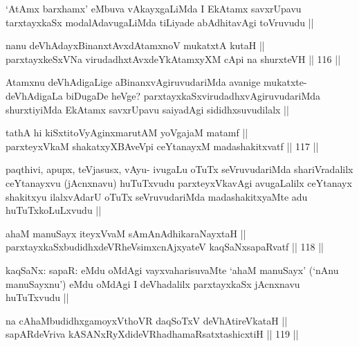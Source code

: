 \begin{artha}
`AtAmx barxhamx' eMbuva vAkayxgaLiMda I EkAtamx savxrUpavu tarxtayxkaSx modalAdavugaLiMda tiLiyade abAdhitavAgi toVruvudu ||             
\end{artha}


\begin{shl}
nanu deVhAdayxBinanxtAvxdAtamxnoV mukatxtA kutaH ||  \\
parxtayxkeSxVNa virudadhxtAvxdeYkAtamxyXM cApi na shurxteVH ||  116 ||  
\end{shl}

\begin{artha}
Atamxnu deVhAdigaLige aBinanxvAgiruvudariMda avanige mukatxte- deVhAdigaLa biDugaDe heVge? parxtayxkaSxvirudadhxvAgiruvudariMda shurxtiyiMda EkAtamx savxrUpavu saiyadAgi sididhxsuvudilalx ||
\end{artha}


\begin{shl}
tathA hi kiSxtitoVyAginxmarutAM yoVgajaM matamf || \\
parxteyxVkaM shakatxyXBAveV\s pi ceYtanayxM madashakitxvatf ||  117 ||  
\end{shl}

\begin{artha}
paqthivi, apupx, teVjasusx, vAyu- ivugaLu oTuTx seVruvudariMda shariVradalilx ceYtanayxvu (jAcnxnavu) huTuTxvudu parxteyxVkavAgi avugaLalilx ceYtanayx shakitxyu ilalxvAdarU oTuTx seVruvudariMda madashakitxyaMte adu huTuTxkoLuLxvudu ||
\end{artha}


\begin{shl}
ahaM manuSayx iteyxVvaM sAmAnAdhikaraNayxtaH || \\
parxtayxkaSxbudidhxdeVRheV\s simxcnAjxyateV kaqSaNxsapaRvatf ||  118 ||  
\end{shl}

\begin{artha}
kaqSaNx: sapaR: eMdu oMdAgi vayxvaharisuvaMte `ahaM manuSayx' (`nAnu manuSayxnu') eMdu oMdAgi I deVhadalilx parxtayxkaSx jAcnxnavu huTuTxvudu ||
\end{artha}

\begin{shl}
na cAhaMbudidhxgamoyxV\s thoVR daqSoTxV deVhAtireVkataH || \\
sapARdeVriva kASANxRyXdideVRhadhamaRsatxtashicxtiH ||  119 ||  
\end{shl}


